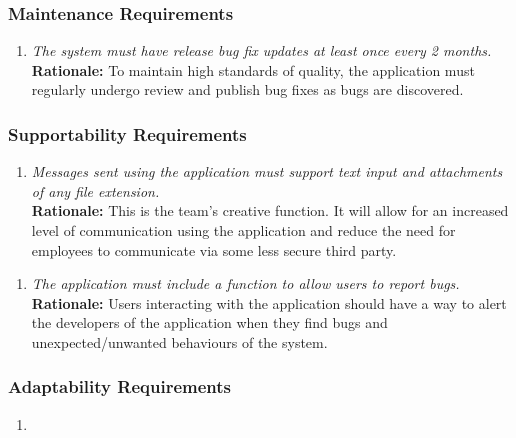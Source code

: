 \documentclass[]{article}
\begin{document}
\begin{enumerate}[{\bf BE1.}]
\subsubsection{Maintenance Requirements}
\label{ssub:maintenance_requirements}
\begin{enumerate}[{MS-M}1. ]
    \item \emph{The system must have release bug fix updates at least once every 2 months.}\\
    {\bf Rationale:} To maintain high standards of quality, the application must regularly undergo review and publish bug fixes as bugs are discovered.
\end{enumerate}


\subsubsection{Supportability Requirements}
\label{ssub:supportability_requirements}
\begin{enumerate}[{MS-S}1. ]
    \item \emph{Messages sent using the application must support text input and attachments of any file extension.}\\
    {\bf Rationale:} This is the team’s creative function. It will allow for an increased level of communication using the application and reduce the need for employees to communicate via some less secure third party.
\end{enumerate}


\begin{enumerate}[{MS-S}2. ]
    \item \emph{The application must include a function to allow users to report bugs. }\\
    {\bf Rationale:} Users interacting with the application should have a way to alert the developers of the application when they find bugs and unexpected/unwanted behaviours of the system.
\end{enumerate}


\subsubsection{Adaptability Requirements}
\label{ssub:adaptability_requirements}
\begin{enumerate}[{NA}]
    \item
\end{enumerate}



\end{enumerate}
\end{document}

